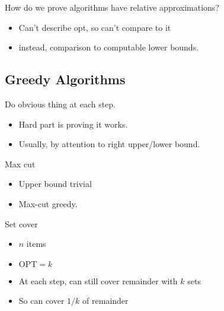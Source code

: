 \documentclass{article}
\begin{document}
How do we prove algorithms have relative approximations?  
\begin{itemize}
\item Can't describe opt, so can't compare to it
\item instead, comparison to computable lower bounds.
\end{itemize}

\subsection*{Greedy Algorithms}
\def\OPT{{\mbox{OPT}}}


Do obvious thing at each step.
\begin{itemize}
\item Hard part is proving it works.
\item Usually, by attention to right upper/lower bound.
\end{itemize}

Max cut
\begin{itemize}
\item Upper bound trivial
\item Max-cut greedy.
\end{itemize}

\iffalse
this is homework!
Min-diameter clustering?
\begin{itemize}
\item Gonzales' algorithm.
\item Distances to existing centers keep dropping
\item Suppose after $k$ chosen, farthest remaining is distance $d$
\item Then $\OPT \ge d$
\begin{itemize}
\item  $k+1$ mutually-distance-$d$ points
\item some must  share a cluster
\end{itemize}
\item Now assign each point to closest center
\item Max distance from center (radius) is $d$
\item So max diameter is $2d$
\item 2-approx.
\end{itemize}
\fi

Set cover
\begin{itemize}
\item $n$ items
\item $\OPT=k$
\item At each step, can still cover remainder with $k$ sets
\item So can cover $1/k$ of remainder
\end{itemize}
\end{document}
